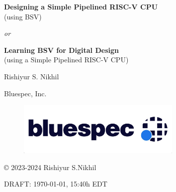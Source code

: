 
\pagestyle{empty}

\begin{center}

\vspace*{1.5in}

{\LARGE\bf Designing a Simple Pipelined RISC-V CPU} \\
{\Large (using BSV)}

\emph{or}

{\LARGE\bf Learning BSV for Digital Design} \\
{\Large (using a Simple Pipelined RISC-V CPU)}

\vspace{2cm}

{\Large Rishiyur S. Nikhil}

Bluespec, Inc.

\vspace*{0.5in}

\begin{figure}[htbp]
  \centerline{\includegraphics[height=1in,angle=0]{ch000_front/Bluespec_Logo_2022-10}}
\end{figure}

\vspace*{0.5in}

\copyright{} 2023-2024 Rishiyur S.Nikhil

\vspace{1in}

{\small DRAFT: \today, 15:40h EDT}

\end{center}


% 



\vspace*{2in}


% 


\newpage

\pagestyle{myheadings}


{\small

\tableofcontents

}




